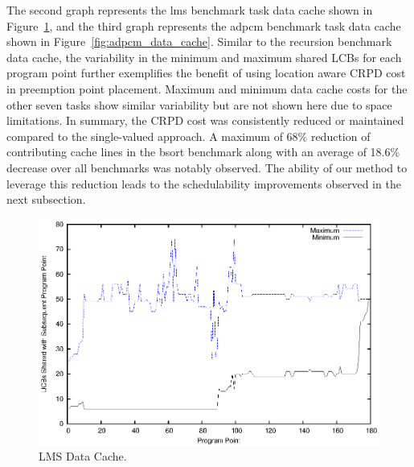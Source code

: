The second graph represents the lms benchmark task data cache shown in Figure~\ref{fig:lms_data_cache}, and the third graph represents the adpcm benchmark task data cache shown in Figure~\ref{fig:adpcm_data_cache}. Similar to the recursion benchmark data cache, the variability in the minimum and maximum shared LCBs for each program point further exemplifies the benefit of using location aware CRPD cost in preemption point placement.  Maximum and minimum data cache costs for the other seven tasks show similar variability but are not shown here due to space limitations.  In summary, the CRPD cost was consistently reduced or maintained compared to the single-valued approach.  A maximum of 68\% reduction of contributing cache lines in the bsort benchmark along with an average of 18.6\% decrease over all benchmarks was notably observed.  The ability of our method to leverage this reduction leads to the schedulability improvements observed in the next subsection.
\begin{figure}[h!]
\vspace{-10pt}
\begin{center}
\includegraphics[width=\linewidth]{eps/lms-dcache.eps}
\caption{LMS Data Cache.}
\label{fig:lms_data_cache}
\end{center}
\vspace{-10pt}
\end{figure}
